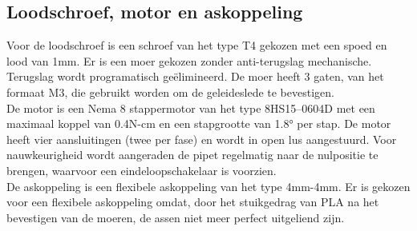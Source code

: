 \subsection{Loodschroef, motor en askoppeling}\label{sec: motor}
Voor de loodschroef is een schroef van het type T4 gekozen met een spoed en lood van 1mm. Er is een moer gekozen zonder anti-terugslag mechanische. Terugslag wordt programatisch geëlimineerd. De moer heeft 3 gaten, van het formaat M3, die gebruikt worden om de geleideslede te bevestigen.
\\[12pt]De motor is een Nema 8 stappermotor van het type 8HS15--0604D met een maximaal koppel van 0.4N-cm en een stapgrootte van 1.8° per stap. De motor heeft vier aansluitingen (twee per fase) en wordt in open lus aangestuurd. Voor nauwkeurigheid wordt aangeraden de pipet regelmatig naar de nulpositie te brengen, waarvoor een eindeloopschakelaar is voorzien.
\\[12pt]De askoppeling is een flexibele askoppeling van het type 4mm-4mm. Er is gekozen voor een flexibele askoppeling omdat, door het stuikgedrag van PLA na het bevestigen van de moeren, de assen niet meer perfect uitgeliend zijn.

